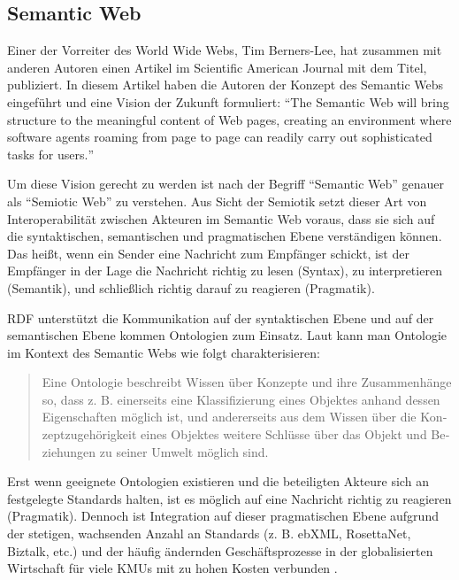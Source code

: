 \documentclass[float=false, crop=false]{standalone}
\begin{document}
\subsection{Semantic Web}
\label{sec:semantic-web}

Einer der Vorreiter des World Wide Webs, Tim Berners-Lee, hat zusammen mit anderen Autoren \citeyear{berners2001semantic} einen Artikel im Scientific American Journal mit dem Titel,  publiziert. In diesem Artikel haben die Autoren der Konzept des Semantic Webs eingeführt und eine Vision der Zukunft formuliert: \hyphenquote{german}{The Semantic Web will bring structure to the meaningful content of Web pages, creating an environment where software agents roaming from page to page can readily carry out sophisticated tasks for users.}

Um diese Vision gerecht zu werden ist nach \citeauthor{blumauer2006semantic} der Begriff \hyphenquote{german}{Semantic Web} genauer als \hyphenquote{german}{Semiotic Web} zu verstehen. Aus Sicht der Semiotik setzt dieser Art von Interoperabilität zwischen Akteuren im Semantic Web voraus, dass sie sich auf die syntaktischen, semantischen und pragmatischen Ebene verständigen können. Das heißt, wenn ein Sender eine Nachricht zum Empfänger schickt, ist der Empfänger in der Lage die Nachricht richtig zu lesen (Syntax), zu interpretieren (Semantik), und schließlich richtig darauf zu reagieren (Pragmatik)\autocite[vgl.]{voigtmann2002enterprise}. 

RDF unterstützt die Kommunikation auf der syntaktischen Ebene und auf der semantischen Ebene kommen Ontologien zum Einsatz. Laut \citeauthor[S.~488]{may2006semantic} kann man Ontologie im Kontext des Semantic Webs wie folgt charakterisieren: \hyphenblockquote{german}{Eine Ontologie beschreibt Wissen über Konzepte und ihre Zusammenhänge so, dass z. B. einerseits eine Klassifizierung eines Objektes anhand dessen Eigenschaften möglich ist, und andererseits aus dem Wissen über die Konzeptzugehörigkeit eines Objektes weitere Schlüsse über das Objekt und Beziehungen zu seiner Umwelt möglich sind.} Erst wenn geeignete Ontologien existieren und die beteiligten Akteure sich an festgelegte Standards halten, ist es möglich auf eine Nachricht richtig zu reagieren (Pragmatik). Dennoch ist Integration auf dieser pragmatischen Ebene aufgrund der stetigen, wachsenden Anzahl an Standards (z. B. ebXML, RosettaNet, Biztalk, etc.) und der häufig ändernden Geschäftsprozesse in der globalisierten Wirtschaft für viele KMUs mit zu hohen Kosten verbunden \autocite[vgl.][S.~4ff]{rebstock2008ontologies}.
\end{document}
